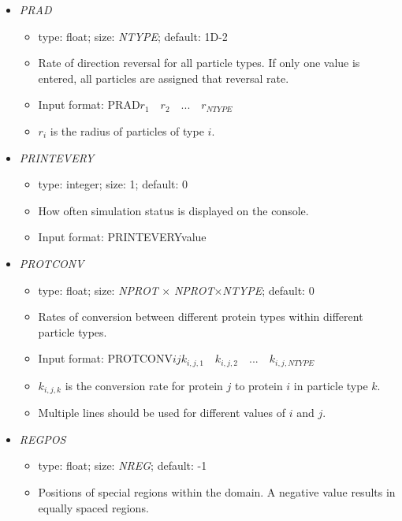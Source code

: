 \documentclass[12pt]{article}
\begin{document}
\begin{itemize}
\begin{itemize}
	\item Input format: PFUSE\quad$i$\quad$p_{i,1}\quad p_{i,2}\quad...\quad p_{i,NTYPE}$
	\item $p_{i,j}$ is the fusion rate between particle types $i$ and $j$
	\item Multiple lines should be used for different values of $i$.
\end{itemize}
%
\item {\it PRAD}
\begin{itemize}
	\item  type: float; size: \textit{NTYPE}; default: 1D-2
	\item Rate of direction reversal for all particle types. If only one value is entered, all particles are assigned that reversal rate. 
	\item Input format: PRAD\quad$r_{1}\quad r_{2}\quad...\quad r_{NTYPE}$
	\item $r_{i}$ is the radius of particles of type $i$.
\end{itemize}
%
\item {\it PRINTEVERY}
\begin{itemize}
	\item  type: integer; size: 1; default: 0
	\item How often simulation status is displayed on the console.
	\item Input format: PRINTEVERY\quad value
\end{itemize}
%
\item {\it PROTCONV}
\begin{itemize}
	\item  type: float; size: \textit{NPROT} $\times$ \textit{NPROT}$\times$\textit{NTYPE}; default: 0
	\item Rates of conversion between different protein types within different particle types.
	\item Input format: PROTCONV\quad$i$\quad$j$\quad$k_{i,j,1}\quad k_{i,j,2}\quad...\quad k_{i,j,NTYPE}$
	\item $k_{i,j,k}$ is the conversion rate for protein $j$ to protein $i$ in particle type $k$.
	\item Multiple lines should be used for different values of $i$ and $j$.
\end{itemize}
%
\item {\it REGPOS}
\begin{itemize}
	\item  type: float; size: \textit{NREG}; default: -1
	\item Positions of special regions within the domain. A negative value results in equally spaced regions.

\end{itemize}
\end{itemize}
\end{document}
